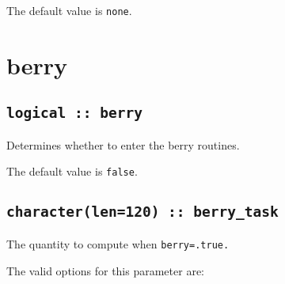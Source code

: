 The default value is {\tt none}.


\clearpage
\section{berry}

\subsection[berry]{\tt logical :: berry}
Determines whether to enter the berry routines.

The default value is \verb#false#.


\subsection[berry\_task]{\tt character(len=120) ::  berry\_task}
The quantity to compute when {\tt berry=.true.}

The valid options for this parameter are:

